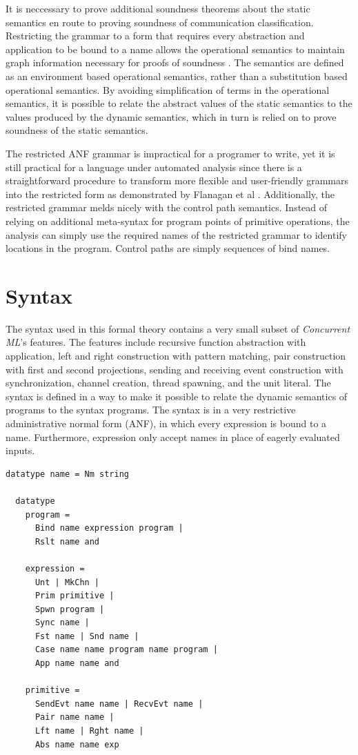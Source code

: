 \documentclass[10pt]{article}
\begin{document}
It is neccessary to prove additional soundness theorems about the static semantics en route to
proving soundness of communication classification. Restricting the grammar to a form that
requires
every abstraction and application to be bound to a name allows the operational
semantics to maintain graph information necessary for proofs of soundness \cite{}.
The semantics are defined as an environment based operational semantics, rather than a
substitution based operational semantics. By avoiding simplification of terms in the
operational semantics, it is possible to relate
the abstract values of the static semantics to the
values produced by the dynamic semantics, which in turn is relied on to prove 
soundness of the static semantics.

The restricted ANF grammar is impractical
for a programer to write, yet it is still practical for
a language under automated analysis since there is a straightforward procedure to transform
more flexible and user-friendly grammars into the
restricted form as demonstrated by Flanagan et al \cite{}.
Additionally, the restricted grammar melds nicely with the control path semantics.
Instead of relying on additional meta-syntax for program points of primitive operations,
the analysis 
can simply use the required names of the restricted grammar to identify
locations in the program.
Control paths are simply sequences of bind names.

\section{Syntax}
The syntax used in this formal theory contains a very small subset of
\textit{Concurrent ML}'s features. The features include recursive function abstraction with
application, left and right construction with pattern matching, pair construction with first
and second projections, sending and receiving event construction with synchronization,
channel creation, thread spawning, and the unit literal. The syntax is defined in a way to
make it possible to relate the dynamic semantics of programs to the syntax programs.
The syntax is in a very restrictive administrative normal form (ANF), in which every expression
is bound to a name. Furthermore, expression only accept names in place of eagerly evaluated
inputs. 

\begin{lstlisting}[language=logic]
  datatype name = Nm string

  datatype 
    program = 
      Bind name expression program |
      Rslt name and 

    expression = 
      Unt | MkChn |
      Prim primitive |
      Spwn program |
      Sync name |
      Fst name | Snd name |
      Case name name program name program |
      App name name and 

    primitive = 
      SendEvt name name | RecvEvt name |
      Pair name name |
      Lft name | Rght name |
      Abs name name exp
  \end{lstlisting}
\end{document}
